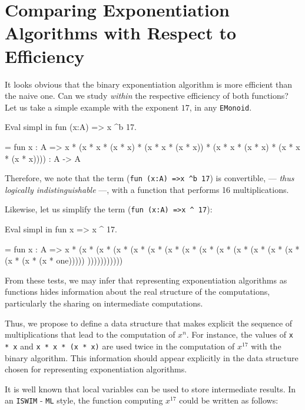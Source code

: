 \section{Comparing Exponentiation Algorithms with Respect to Efficiency}

It looks obvious that  the binary exponentiation algorithm is more efficient than the 
naive one. Can we study \emph{within \coq{}} the respective efficiency of both functions?
Let us take a simple example with the exponent $17$,  in any \texttt{EMonoid}.

\begin{Coqsrc}
Eval simpl in   fun (x:A) => x ^b 17.
\end{Coqsrc}

\begin{Coqanswer}
 = fun x : A =>
       x *
       (x * x * (x * x) * (x * x * (x * x)) *
        (x * x * (x * x) * (x * x * (x * x))))
     : A -> A  
\end{Coqanswer}

Therefore, we note that the term (\Verb|fun (x:A) =>x ^b 17|)  is
convertible, --- \emph{thus logically indistinguishable} ---, with a function that performs 16 multiplications.

Likewise, let us simplify the term (\Verb|fun (x:A) =>x ^ 17|):

\begin{Coqsrc}
Eval simpl in   fun x =>  x ^ 17.  
\end{Coqsrc}

\begin{Coqanswer}
= fun x : A =>
   x * (x *  (x *  (x *  (x *   (x *  (x *  (x *
    (x * (x * (x * (x * (x * (x * (x * (x * (x * one)))))
  )))))))))))  
\end{Coqanswer}


From these tests, we may infer that  representing exponentiation algorithms as \coq{}  functions hides
information about the real structure of the computations, particularly the sharing on intermediate computations.

Thus, we propose to define a data structure that makes explicit the sequence of multiplications that lead to the computation of $x^n$. For instance, the values of  
\texttt{x * x} and
\texttt{x * x * (x * x)}  are used
twice in the  computation of $x^{17}$ with the binary algorithm. This information should 
appear explicitly in the data structure chosen for representing exponentiation 
algorithms.

It is well known that local variables can be used to store intermediate results.
In an \texttt{ISWIM} - \texttt{ML} style, the function computing $x^{17}$ could be written as follows:

